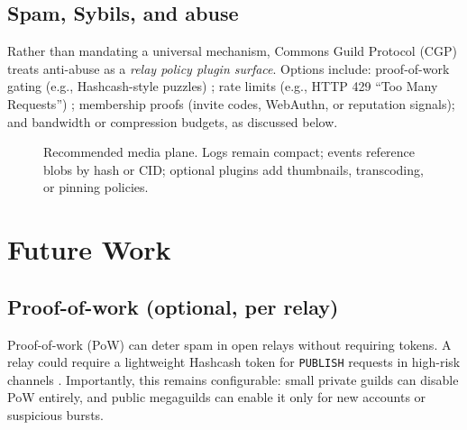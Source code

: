 \documentclass[conference]{IEEEtran}
\newcommand{\cgp}{Commons Guild Protocol (CGP)\xspace}
\begin{document}
\subsection{Spam, Sybils, and abuse}
Rather than mandating a universal mechanism, \cgp treats anti-abuse as a \emph{relay policy plugin surface}. Options include: proof-of-work gating (e.g., Hashcash-style puzzles) \cite{hashcash2}; rate limits (e.g., HTTP 429 ``Too Many Requests'') \cite{rfc6585}; membership proofs (invite codes, WebAuthn, or reputation signals); and bandwidth or compression budgets, as discussed below.

\begin{figure}[t]
\centering
{}
\caption{Recommended media plane. Logs remain compact; events reference blobs by hash or CID; optional plugins add thumbnails, transcoding, or pinning policies.}
\label{fig:media}
\end{figure}

\section{Future Work}
\subsection{Proof-of-work (optional, per relay)}
Proof-of-work (PoW) can deter spam in open relays without requiring tokens. A relay could require a lightweight Hashcash token for \texttt{PUBLISH} requests in high-risk channels \cite{hashcash2}. Importantly, this remains configurable: small private guilds can disable PoW entirely, and public megaguilds can enable it only for new accounts or suspicious bursts.
\end{document}
